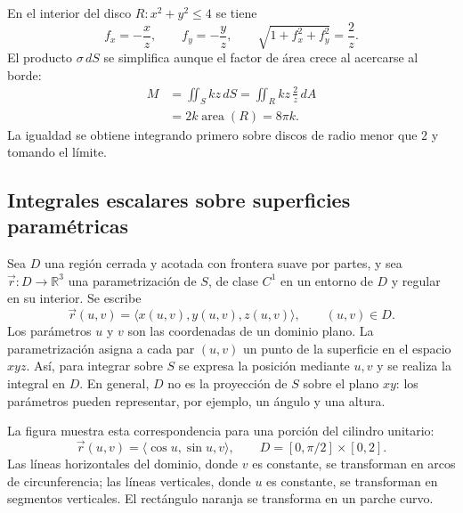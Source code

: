 En el interior del disco $R:x^2+y^2\leq4$ se tiene
\[
f_x=-\frac{x}{z},\qquad f_y=-\frac{y}{z},\qquad
\sqrt{1+f_x^2+f_y^2}=\frac{2}{z}.
\]
El producto $\sigma\,dS$ se simplifica aunque el factor de área crece al acercarse al borde:
\begin{align*}
M&=\iint_S kz\,dS
=\iint_R kz\,\frac{2}{z}\,dA\\
&=2k\operatorname{area}(R)=8\pi k.
\end{align*}
La igualdad se obtiene integrando primero sobre discos de radio menor que $2$ y tomando el límite.

\begingroup\shorthandoff{>}
\begin{center}
\end{center}
\endgroup

\subsection{Integrales escalares sobre superficies paramétricas}

Sea $D$ una región cerrada y acotada con frontera suave por partes, y sea $\vec r:D\to\mathbb R^3$ una parametrización de $S$, de clase $C^1$ en un entorno de $D$ y regular en su interior. Se escribe
\[
\vec r(u,v)=\langle x(u,v),y(u,v),z(u,v)\rangle,
\qquad (u,v)\in D.
\]
Los parámetros $u$ y $v$ son las coordenadas de un dominio plano. La parametrización asigna a cada par $(u,v)$ un punto de la superficie en el espacio $xyz$. Así, para integrar sobre $S$ se expresa la posición mediante $u,v$ y se realiza la integral en $D$. En general, $D$ no es la proyección de $S$ sobre el plano $xy$: los parámetros pueden representar, por ejemplo, un ángulo y una altura.

La figura muestra esta correspondencia para una porción del cilindro unitario:
\[
\vec r(u,v)=\langle\cos u,\sin u,v\rangle,
\qquad D=[0,\pi/2]\times[0,2].
\]
Las líneas horizontales del dominio, donde $v$ es constante, se transforman en arcos de circunferencia; las líneas verticales, donde $u$ es constante, se transforman en segmentos verticales. El rectángulo naranja se transforma en un parche curvo.

